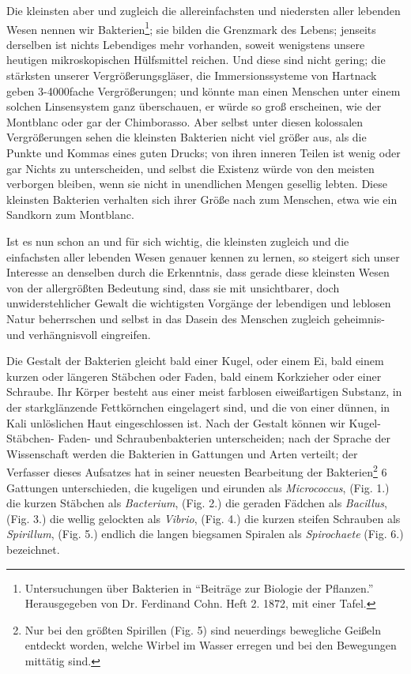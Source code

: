 \documentclass[a4paper, 11pt, oneside, english]{article}
\begin{document}
Die kleinsten aber und zugleich die allereinfachsten und niedersten aller lebenden Wesen nennen wir Bakterien\footnote{Untersuchungen über Bakterien in "`Beiträge zur Biologie der Pflanzen."' Herausgegeben von Dr. Ferdinand Cohn. Heft 2. 1872, mit einer Tafel.}; sie bilden die Grenzmark des Lebens; jenseits derselben ist nichts Lebendiges mehr vorhanden, soweit wenigstens unsere heutigen mikroskopischen Hülfsmittel reichen. Und diese sind nicht gering; die stärksten unserer Vergrößerungsgläser, die Immersionssysteme von Hartnack geben 3-4000fache Vergrößerungen; und könnte man einen Menschen unter einem solchen Linsensystem ganz überschauen, er würde so groß erscheinen, wie der Montblanc oder gar der Chimborasso. Aber selbst unter diesen kolossalen Vergrößerungen sehen die kleinsten Bakterien nicht viel größer aus, als die Punkte und Kommas eines guten Drucks; von ihren inneren Teilen ist wenig oder gar Nichts zu unterscheiden, und selbst die Existenz würde von den meisten verborgen bleiben, wenn sie nicht in unendlichen Mengen gesellig lebten. Diese kleinsten Bakterien verhalten sich ihrer Größe nach zum Menschen, etwa wie ein Sandkorn zum Montblanc.

Ist es nun schon an und für sich wichtig, die kleinsten zugleich und die einfachsten aller lebenden Wesen genauer kennen zu lernen, so steigert sich unser Interesse an denselben durch die Erkenntnis, dass gerade diese kleinsten Wesen von der allergrößten Bedeutung sind, dass sie mit unsichtbarer, doch unwiderstehlicher Gewalt die wichtigsten Vorgänge der lebendigen und leblosen Natur beherrschen und selbst in das Dasein des Menschen zugleich geheimnis- und verhängnisvoll eingreifen.

Die Gestalt der Bakterien gleicht bald einer Kugel, oder einem Ei, bald einem kurzen oder längeren Stäbchen oder Faden, bald einem Korkzieher oder einer Schraube. Ihr Körper besteht aus einer meist farblosen eiweißartigen Substanz, in der starkglänzende Fettkörnchen eingelagert sind, und die von einer dünnen, in Kali unlöslichen Haut eingeschlossen ist. Nach der Gestalt können wir Kugel- Stäbchen- Faden- und Schraubenbakterien unterscheiden; nach der Sprache der Wissenschaft werden die Bakterien in Gattungen und Arten verteilt; der Verfasser dieses Aufsatzes hat in seiner neuesten Bearbeitung der Bakterien\footnote{Nur bei den größten Spirillen (Fig. 5) sind neuerdings bewegliche Geißeln entdeckt worden, welche Wirbel im Wasser erregen und bei den Bewegungen mittätig sind.} 6 Gattungen unterschieden, die kugeligen und eirunden als \emph{Micrococcus}, (Fig. 1.) die kurzen Stäbchen als \emph{Bacterium}, (Fig. 2.) die geraden Fädchen als \emph{Bacillus}, (Fig. 3.) die wellig gelockten als \emph{Vibrio}, (Fig. 4.) die kurzen steifen Schrauben als \emph{Spirillum}, (Fig. 5.) endlich die langen biegsamen Spiralen als \emph{Spirochaete} (Fig. 6.) bezeichnet.
\end{document}
